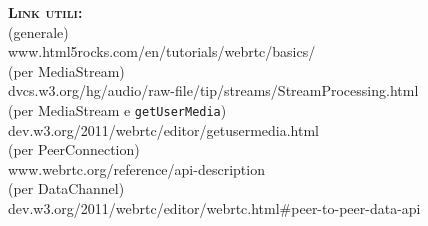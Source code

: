\begin{description}
	\item{\scshape\bfseries Link utili:}\\
  (generale)\\
  www.html5rocks.com/en/tutorials/webrtc/basics/\\
  (per MediaStream)\\
  dvcs.w3.org/hg/audio/raw-file/tip/streams/StreamProcessing.html\\
  (per MediaStream e \texttt{getUserMedia})\\
  dev.w3.org/2011/webrtc/editor/getusermedia.html\\
  (per PeerConnection)\\
  www.webrtc.org/reference/api-description\\
  (per DataChannel)\\
  dev.w3.org/2011/webrtc/editor/webrtc.html\#peer-to-peer-data-api\\
\end{description}
